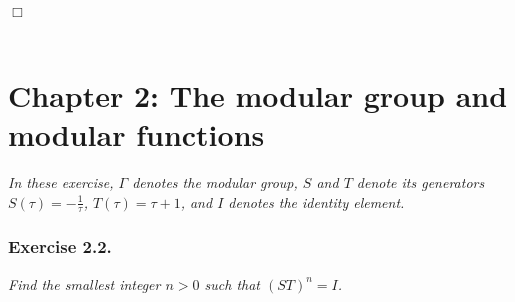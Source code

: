 \documentclass{article}
\begin{document}
$\Box$ \\\\






\newpage
\section*{Chapter 2: The modular group and modular functions \\}



\emph{In these exercise, $\Gamma$ denotes the modular group,
$S$ and $T$ denote its generators $S(\tau) = -\frac{1}{\tau}$, $T(\tau) = \tau + 1$,
and $I$ denotes the identity element.} \\






\subsubsection*{Exercise 2.2.}
\emph{Find the smallest integer $n > 0$ such that $(ST)^n = I$.} \\
\end{document}
